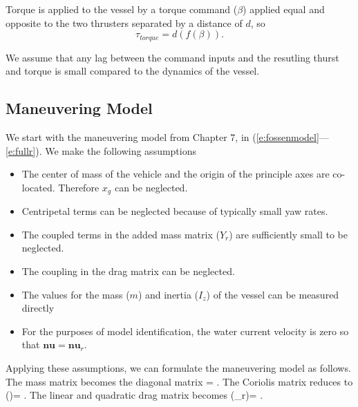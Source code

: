 \documentclass[11pt,draftcls,journal,onecolumn]{../latexlib/latex_ieee/IEEEtran}
\begin{document}
Torque is applied to the vessel by a torque command ($\beta$) applied equal and opposite to the two thrusters separated by a distance of $d$, so
\begin{equation}
\tau_{torque}= d (f(\beta)).
\label{e:torque}
\end{equation}

We assume that any lag between the command inputs and the resutling thurst and torque is small compared to the dynamics of the vessel.

\subsection{Maneuvering Model}
We start with the maneuvering model from \cite{fossen11handbook} Chapter 7, in (\ref{e:fossenmodel}---\ref{e:fullr}).  We make the following assumptions
\begin{itemize}
\item The center of mass of the vehicle and the origin of the principle axes are co-located.  Therefore $x_g$ can be neglected.
\item Centripetal terms can be neglected because of typically small yaw rates.
\item The coupled terms in the added mass matrix ($Y_{\dot{r}}$) are sufficiently small to be neglected.
\item The coupling in the drag matrix can be neglected.
\item The values for the mass ($m$) and inertia ($I_z$) of the vessel can be measured directly
\item For the purposes of model identification, the water current velocity is zero so that $\bm{nu}=\bm{nu}_r$.
\end{itemize}
Applying these assumptions, we can formulate the maneuvering model as follows.  The mass matrix becomes the diagonal matrix
\beqn
{}= .
\eeqn
The Coriolis matrix reduces to 
\beqn
{}(\bm{\nu})= .
\eeqn
The linear and quadratic drag matrix becomes
\beqn
{}(\bm{\nu}_r)= .
\eeqn
\end{document}
